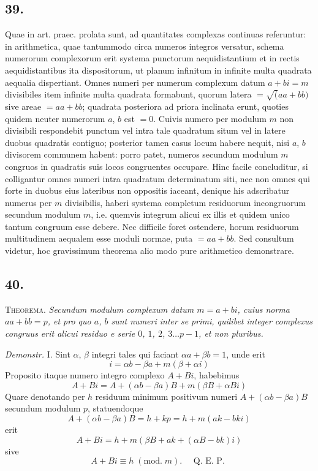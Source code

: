 \documentclass[twoside,12pt]{memoir}
\renewcommand{\pmod}[1]{\;(\textrm{mod.}\;#1)}
\begin{document}
\subsection*{39.}
 
Quae in art. praec. prolata sunt, ad quantitates complexas continuas referuntur: in arithmetica, quae tantummodo circa numeros integros versatur, schema numerorum complexorum erit systema punctorum aequidistantium et in rectis aequidistantibus ita dispositorum, ut planum infinitum in infinite multa quadrata aequalia dispertiant. Omnes numeri per numerum complexum datum \(a+b i=m\) divisibiles item infinite multa quadrata formabunt, quorum latera \(=\surd(a a+b b)\) sive areae \(=a a+b b\); quadrata posteriora ad priora inclinata erunt, quoties quidem neuter numerorum \(a\), \(b\) est \(=0\). Cuivis numero per modulum \(m\) non divisibili respondebit punctum vel intra tale quadratum situm vel in latere duobus quadratis contiguo; posterior tamen casus locum habere nequit, nisi \(a\), \(b\) divisorem communem habent: porro patet, numeros secundum modulum \(m\) congruos in quadratis suis locos congruentes occupare. Hinc facile concluditur, si colligantur omnes numeri intra quadratum determinatum siti, nec non omnes qui forte in duobus eius lateribus non oppositis iaceant, denique his adscribatur numerus per \(m\) divisibilis, haberi systema completum residuorum incongruorum secundum modulum \(m\), i.e. quemvis integrum alicui ex illis et quidem unico tantum congruum esse debere. Nec difficile foret ostendere, horum residuorum multitudinem aequalem esse moduli normae, puta \(=a a+b b\). Sed consultum videtur, hoc gravissimum theorema alio modo pure arithmetico demonstrare.

\subsection*{40.}
 
\textsc{Theorema.} \textit{Secundum modulum complexum datum \(m=a+b i\), cuius norma \(a a+b b=p\), et pro quo \(a\), \(b\) sunt numeri inter se primi, quilibet integer complexus congruus erit alicui residuo e serie \(0\), \(1\), \(2\), \(3 \ldots p-1\), et non pluribus.}\pagebreak%
 
\textit{Demonstr.} I. Sint \(\alpha\), \(\beta\) integri tales qui faciant \(\alpha a+\beta b=1\), unde erit
\[i=\alpha b- \beta a+m(\beta+\alpha i)\]
Proposito itaque numero integro complexo \(A+B i\), habebimus
\[A+B i=A+(\alpha b-\beta a) B+m(\beta B+\alpha B i)\]
Quare denotando per \(h\) residuum minimum positivum numeri \(A+(\alpha b-\beta a) B\) secundum modulum \(p\), statuendoque
\[A+(\alpha b-\beta a) B=h+k p=h+m(a k-b k i)\]
erit
\[A+B i=h+m(\beta B+a k+(\alpha B-b k) i)\]
sive
\[A+B i \equiv h\pmod{m} . \quad \text{ Q. E. P. }\]
 
\end{document}
